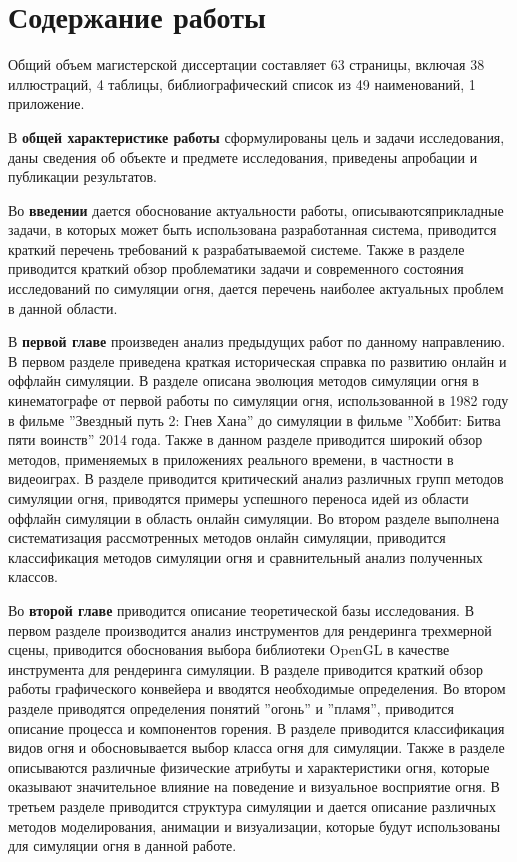 \part*{Содержание работы}

Общий объем магистерской диссертации составляет 63 страницы, включая 38
иллюстраций, 4 таблицы, библиографический список из 49 наименований, 1
приложение.

В \textbf{общей характеристике работы} сформулированы цель и задачи
исследования, даны сведения об объекте и предмете исследования, приведены
апробации и публикации результатов.

Во \textbf{введении} дается обоснование актуальности работы,
описываются\break{}прикладные задачи, в которых может быть использована
разработанная система, приводится краткий перечень требований к разрабатываемой
системе. Также в разделе приводится краткий обзор проблематики задачи и
современного состояния исследований по симуляции огня, дается перечень наиболее
актуальных проблем в данной области.

В \textbf{первой главе} произведен анализ предыдущих работ по данному
направлению. В первом разделе приведена краткая историческая справка по развитию
онлайн и оффлайн симуляции. В разделе описана эволюция методов симуляции огня в
кинематографе от первой работы по симуляции огня, использованной в 1982 году в
фильме ''Звездный путь 2: Гнев Хана'' до симуляции в фильме ''Хоббит: Битва пяти
воинств'' 2014 года. Также в данном разделе приводится широкий обзор методов,
применяемых в приложениях реального времени, в частности в видеоиграх. В разделе
приводится критический анализ различных групп методов симуляции огня, приводятся
примеры успешного переноса идей из области оффлайн симуляции в область онлайн
симуляции. Во втором разделе выполнена систематизация рассмотренных методов
онлайн симуляции, приводится классификация методов симуляции огня и
сравнительный анализ полученных классов.

Во \textbf{второй главе} приводится описание теоретической базы исследования.
В первом разделе производится анализ инструментов для рендеринга трехмерной
сцены, приводится обоснования выбора библиотеки OpenGL в качестве инструмента
для рендеринга симуляции. В разделе приводится краткий обзор работы графического
конвейера и вводятся необходимые определения. Во втором разделе
приводятся определения понятий ''огонь'' и ''пламя'', приводится описание
процесса и компонентов горения. В разделе приводится
классификация видов огня и обосновывается выбор класса огня для симуляции. Также
в разделе описываются различные физические атрибуты и характеристики огня,
которые оказывают значительное влияние на поведение и визуальное восприятие
огня. В третьем разделе приводится структура симуляции и дается описание
различных методов моделирования, анимации и визуализации, которые будут
использованы для симуляции огня в данной работе.


